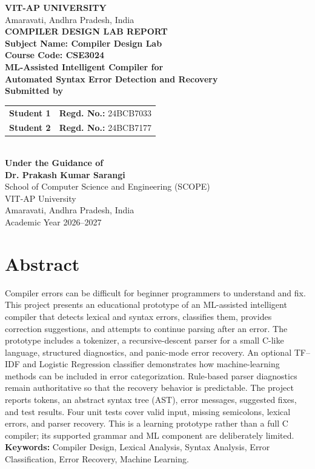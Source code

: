 \documentclass[12pt,a4paper]{article}
\begin{document}
\begin{titlepage}
\begin{center}
\vspace*{0.5cm}
{\Large\bfseries VIT-AP UNIVERSITY}\\[0.3cm]
{\large Amaravati, Andhra Pradesh, India}\\[1.0cm]
{\Large\bfseries COMPILER DESIGN LAB REPORT}\\[0.4cm]
{\large \textbf{Subject Name: Compiler Design Lab}}\\[0.15cm]
{\large \textbf{Course Code: CSE3024}}\\[1cm]
{\LARGE\bfseries ML-Assisted Intelligent Compiler for\\
Automated Syntax Error Detection and Recovery}\\[1.2cm]
\textbf{Submitted by}\\[0.4cm]
\begin{tabular}{ll}
\textbf{Student 1} & \textbf{Regd. No.:} 24BCB7033\\[0.4cm]
\textbf{Student 2} & \textbf{Regd. No.:} 24BCB7177
\end{tabular}\\[1.2cm]
\textbf{Under the Guidance of}\\[0.3cm]
\textbf{Dr. Prakash Kumar Sarangi}\\[1cm]
{\large School of Computer Science and Engineering (SCOPE)\\
VIT-AP University\\Amaravati, Andhra Pradesh, India}\\[0.4cm]
{\large Academic Year 2026--2027}
\end{center}
\end{titlepage}

\section*{Abstract}
Compiler errors can be difficult for beginner programmers to understand and fix. This project presents an educational prototype of an ML-assisted intelligent compiler that detects lexical and syntax errors, classifies them, provides correction suggestions, and attempts to continue parsing after an error. The prototype includes a tokenizer, a recursive-descent parser for a small C-like language, structured diagnostics, and panic-mode error recovery. An optional TF--IDF and Logistic Regression classifier demonstrates how machine-learning methods can be included in error categorization. Rule-based parser diagnostics remain authoritative so that the recovery behavior is predictable. The project reports tokens, an abstract syntax tree (AST), error messages, suggested fixes, and test results. Four unit tests cover valid input, missing semicolons, lexical errors, and parser recovery. This is a learning prototype rather than a full C compiler; its supported grammar and ML component are deliberately limited.
\textbf{Keywords:} Compiler Design, Lexical Analysis, Syntax Analysis, Error Classification, Error Recovery, Machine Learning.
\end{document}
